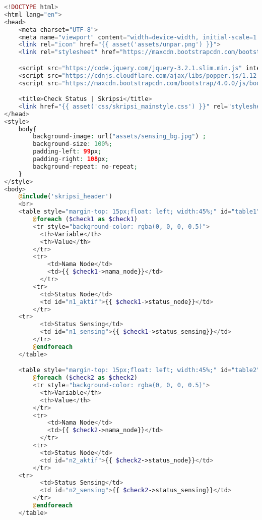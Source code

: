 \begin{lstlisting}[language=PHP, caption=skripsi\_checkstatus.blade.php]
<!DOCTYPE html>
<html lang="en">
<head>
    <meta charset="UTF-8">
    <meta name="viewport" content="width=device-width, initial-scale=1.0, shrink-to-fit=no">
    <link rel="icon" href="{{ asset('assets/unpar.png') }}">
    <link rel="stylesheet" href="https://maxcdn.bootstrapcdn.com/bootstrap/4.0.0/css/bootstrap.min.css" integrity="sha384-Gn5384xqQ1aoWXA+058RXPxPg6fy4IWvTNh0E263XmFcJlSAwiGgFAW/dAiS6JXm" crossorigin="anonymous">

    <script src="https://code.jquery.com/jquery-3.2.1.slim.min.js" integrity="sha384-KJ3o2DKtIkvYIK3UENzmM7KCkRr/rE9/Qpg6aAZGJwFDMVNA/GpGFF93hXpG5KkN" crossorigin="anonymous"></script>
    <script src="https://cdnjs.cloudflare.com/ajax/libs/popper.js/1.12.9/umd/popper.min.js" integrity="sha384-ApNbgh9B+Y1QKtv3Rn7W3mgPxhU9K/ScQsAP7hUibX39j7fakFPskvXusvfa0b4Q" crossorigin="anonymous"></script>
    <script src="https://maxcdn.bootstrapcdn.com/bootstrap/4.0.0/js/bootstrap.min.js" integrity="sha384-JZR6Spejh4U02d8jOt6vLEHfe/JQGiRRSQQxSfFWpi1MquVdAyjUar5+76PVCmYl" crossorigin="anonymous"></script>

    <title>Check Status | Skripsi</title>
    <link href="{{ asset('css/skripsi_mainstyle.css') }}" rel="stylesheet" type="text/css" >
</head>
<style>
    body{
        background-image: url("assets/sensing_bg.jpg") ;
        background-size: 100%;
        padding-left: 99px;
        padding-right: 108px;
        background-repeat: no-repeat;
    }
</style>
<body>
    @include('skripsi_header')
    <br>
    <table style="margin-top: 15px;float: left; width:45%;" id="table1">
        @foreach ($check1 as $check1)
        <tr style="background-color: rgba(0, 0, 0, 0.5)">
          <th>Variable</th>
          <th>Value</th> 
        </tr>
        <tr>
            <td>Nama Node</td>
            <td>{{ $check1->nama_node}}</td>
          </tr>
        <tr>
          <td>Status Node</td>
          <td id="n1_aktif">{{ $check1->status_node}}</td>
        </tr>
	<tr>
          <td>Status Sensing</td>
          <td id="n1_sensing">{{ $check1->status_sensing}}</td>
        </tr>
        @endforeach
    </table>

    <table style="margin-top: 15px;float: left; width:45%;" id="table2">
        @foreach ($check2 as $check2)
        <tr style="background-color: rgba(0, 0, 0, 0.5)">
          <th>Variable</th>
          <th>Value</th> 
        </tr>
        <tr>
            <td>Nama Node</td>
            <td>{{ $check2->nama_node}}</td>
          </tr>
        <tr>
          <td>Status Node</td>
          <td id="n2_aktif">{{ $check2->status_node}}</td>
        </tr>
	<tr>
          <td>Status Sensing</td>
          <td id="n2_sensing">{{ $check2->status_sensing}}</td>
        </tr>
        @endforeach
    </table>


\end{lstlisting}
